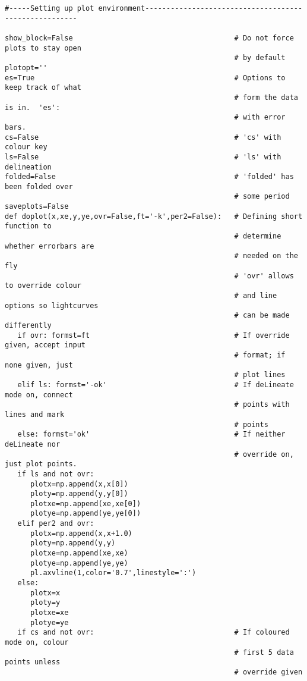 \begin{verbatim}
#-----Setting up plot environment------------------------------------------------------

show_block=False                                      # Do not force plots to stay open
                                                      # by default
plotopt=''
es=True                                               # Options to keep track of what
                                                      # form the data is in.  'es':
                                                      # with error bars.
cs=False                                              # 'cs' with colour key
ls=False                                              # 'ls' with delineation
folded=False                                          # 'folded' has been folded over
                                                      # some period
saveplots=False
def doplot(x,xe,y,ye,ovr=False,ft='-k',per2=False):   # Defining short function to
                                                      # determine whether errorbars are
                                                      # needed on the fly
                                                      # 'ovr' allows to override colour
                                                      # and line options so lightcurves
                                                      # can be made differently
   if ovr: formst=ft                                  # If override given, accept input
                                                      # format; if none given, just
                                                      # plot lines
   elif ls: formst='-ok'                              # If deLineate mode on, connect
                                                      # points with lines and mark
                                                      # points
   else: formst='ok'                                  # If neither deLineate nor
                                                      # override on, just plot points.
   if ls and not ovr:
      plotx=np.append(x,x[0])
      ploty=np.append(y,y[0])
      plotxe=np.append(xe,xe[0])
      plotye=np.append(ye,ye[0])
   elif per2 and ovr:
      plotx=np.append(x,x+1.0)
      ploty=np.append(y,y)
      plotxe=np.append(xe,xe)
      plotye=np.append(ye,ye)
      pl.axvline(1,color='0.7',linestyle=':')      
   else:
      plotx=x
      ploty=y
      plotxe=xe
      plotye=ye
   if cs and not ovr:                                 # If coloured mode on, colour
                                                      # first 5 data points unless
                                                      # override given

\end{verbatim}
